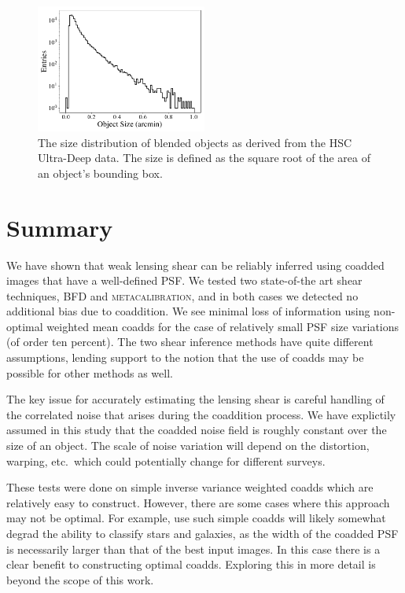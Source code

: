 \documentclass[fleqn,useAMS,usenatbib]{mnras}
\newcommand{\mcal}{\textsc{metacalibration}}
\begin{document}
\begin{figure}
\includegraphics[width=0.5\textwidth]{object_size.png}
\caption{
The size distribution of blended objects as derived from the HSC 
Ultra-Deep data.  The size is defined as the square root of the area of an
object's bounding box.
}
\label{fig:size}
\end{figure}

\section{Summary}
\label{Section:Summary}

We have shown that weak lensing shear can be reliably inferred using coadded
images that have a well-defined PSF.  We tested two state-of-the art shear techniques, BFD and \mcal, and in
both cases we detected no additional bias due to coaddition.  We see minimal
loss of information using non-optimal weighted mean coadds for the case
of relatively small PSF size variations (of order ten percent).  The two shear
inference methods have quite different assumptions, lending support to the notion that the
use of coadds may be possible for other methods as well.

The key issue for accurately estimating the lensing shear is careful handling of the
correlated noise that arises during the coaddition process.  We have explictily
assumed in this study that the coadded noise field is roughly constant over the
size of an object.  The scale of noise variation will depend on the distortion,
warping, etc.\ which could potentially change for different surveys.

These tests were done on simple inverse variance weighted coadds which are
relatively easy to construct.  However, there are some cases where this
approach may not be optimal.  For example, use such simple coadds will likely
somewhat degrad the ability to classify stars and galaxies, as the width of the
coadded PSF is necessarily larger than that of the best input images.  In this
case there is a clear benefit to constructing optimal coadds.  Exploring this in
more detail is beyond the scope of this work.
\end{document}
